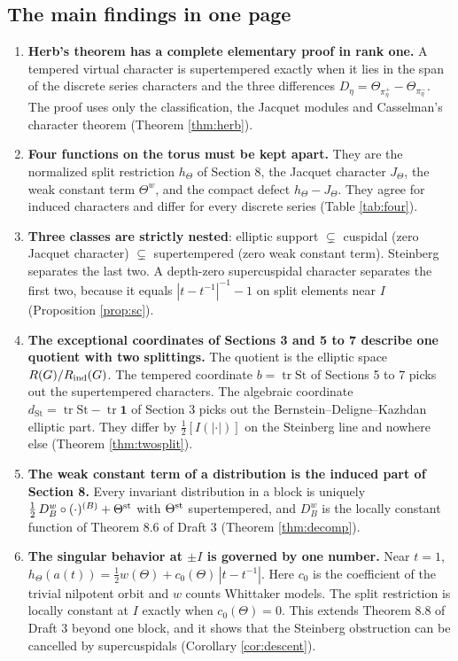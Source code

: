 \documentclass[12pt,letterpaper]{amsart}
\numberwithin{equation}{section}
\theoremstyle{definition}
\theoremstyle{remark}
\newcommand{\St}{\mathrm{St}}
\newcommand{\triv}{\mathbf 1}
\newcommand{\tr}{\operatorname{tr}}
\begin{document}
\subsection*{The main findings in one page}
\begin{enumerate}[leftmargin=*]
\item \textbf{Herb's theorem has a complete elementary proof in rank one.} A tempered virtual character is supertempered exactly when it lies in the span of the discrete series characters and the three differences $D_\eta=\Theta_{\pi_\eta^+}-\Theta_{\pi_\eta^-}$. The proof uses only the classification, the Jacquet modules and Casselman's character theorem (Theorem \ref{thm:herb}).
\item \textbf{Four functions on the torus must be kept apart.} They are the normalized split restriction $h_\Theta$ of Section 8, the Jacquet character $J_\Theta$, the weak constant term $\Theta^w$, and the compact defect $h_\Theta-J_\Theta$. They agree for induced characters and differ for every discrete series (Table \ref{tab:four}).
\item \textbf{Three classes are strictly nested}: elliptic support $\subsetneq$ cuspidal (zero Jacquet character) $\subsetneq$ supertempered (zero weak constant term). Steinberg separates the last two. A depth-zero supercuspidal character separates the first two, because it equals $|t-t^{-1}|^{-1}-1$ on split elements near $I$ (Proposition \ref{prop:sc}).
\item \textbf{The exceptional coordinates of Sections 3 and 5 to 7 describe one quotient with two splittings.} The quotient is the elliptic space $R(G)/R_{\rm ind}(G)$. The tempered coordinate $b=\tr\St$ of Sections 5 to 7 picks out the supertempered characters. The algebraic coordinate $d_{\St}=\tr\St-\tr\triv$ of Section 3 picks out the Bernstein--Deligne--Kazhdan elliptic part. They differ by $\tfrac12[I(|\cdot|)]$ on the Steinberg line and nowhere else (Theorem \ref{thm:twosplit}).
\item \textbf{The weak constant term of a distribution is the induced part of Section 8.} Every invariant distribution in a block is uniquely $\tfrac12\,D^w_B\circ(\cdot)^{(B)}+\Theta^{\rm st}$ with $\Theta^{\rm st}$ supertempered, and $D^w_B$ is the locally constant function of Theorem 8.6 of Draft 3 (Theorem \ref{thm:decomp}).
\item \textbf{The singular behavior at $\pm I$ is governed by one number.} Near $t=1$, $h_\Theta(a(t))=\tfrac12 w(\Theta)+c_0(\Theta)\,|t-t^{-1}|$. Here $c_0$ is the coefficient of the trivial nilpotent orbit and $w$ counts Whittaker models. The split restriction is locally constant at $I$ exactly when $c_0(\Theta)=0$. This extends Theorem 8.8 of Draft 3 beyond one block, and it shows that the Steinberg obstruction can be cancelled by supercuspidals (Corollary \ref{cor:descent}).

\end{enumerate}
\end{document}
